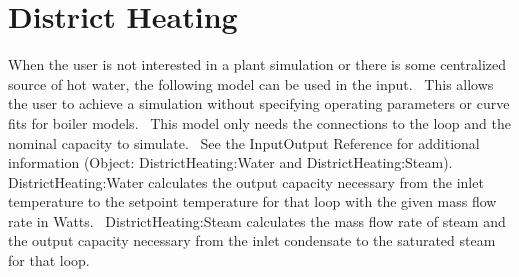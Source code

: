 \section{District Heating }\label{district-heating}

When the user is not interested in a plant simulation or there is some centralized source of hot water, the following model can be used in the input.~ This allows the user to achieve a simulation without specifying operating parameters or curve fits for boiler models.~ This model only needs the connections to the loop and the nominal capacity to simulate.~ See the InputOutput Reference for additional information (Object: DistrictHeating:Water and DistrictHeating:Steam).~ DistrictHeating:Water calculates the output capacity necessary from the inlet temperature to the setpoint temperature for that loop with the given mass flow rate in Watts.~ DistrictHeating:Steam calculates the mass flow rate of steam and the output capacity necessary from the inlet condensate to the saturated steam for that loop. 
